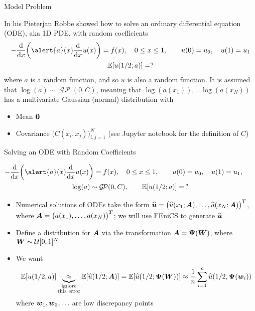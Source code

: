 \documentclass[11pt,compress,xcolor={usenames,dvipsnames},aspectratio=169]{beamer}
\DeclareMathOperator{\GP}{\mathcal{G} \! \mathcal{P}}
\newcommand{\hvu}{\widehat{\vu}}
\newcommand{\hu}{\widehat{u}}
\begin{document}
\begin{frame}{Model Problem}

\vspace{-4ex}

In his \href{https://qmcpy.org/2021/06/04/elliptic-pde-demo/}{} Pieterjan Robbe showed how to solve an ordinary differential equation (ODE), aka 1D PDE, with random coefficients
\begin{gather*}
-\frac{\dif }{\dif x}\biggl(\alert{a}(x) \frac{\dif}{\dif x} u(x) \biggr) = f(x), \quad 0 \leq x \leq 1, \qquad
u(0) = u_0, \quad
u(1) = u_1 \\
\Ex[u(1/2;a)] = ?
\end{gather*}
where \alert{$a$} is a \alert{random} function, and so $u$ is also a \alert{random} function.  It is assumed that $\log(a) \sim \GP(0,C)$, meaning that $\log(a(x_1)), \ldots \log(a(x_N))$ has a \alert{multivariate Gaussian (normal)} distribution with
\begin{itemize}
    \item Mean $\boldsymbol{0}$
    \item Covariance $\bigl( C(x_i,x_j) \bigr)_{i,j=1}^N$ (see Jupyter notebook for the definition of $C$)
\end{itemize}

\end{frame}


\begin{frame}{Solving an ODE with Random Coefficients}

\vspace{-8ex}
\begin{gather*}
-\frac{\dif }{\dif x}\biggl(\alert{a}(x) \frac{\dif}{\dif x} u(x) \biggr) = f(x), \quad 0 \leq x \leq 1, \qquad
u(0) = u_0, \quad
u(1) = u_1, \qquad \\
\log(a) \sim \GP(0,C), \qquad \Ex[u(1/2;a)] = \, ?
\end{gather*}

\vspace{-3ex}
\begin{itemize}
    \item Numerical solutions of ODEs take the form $\hvu = \bigl(\hu(x_1;\vA), \ldots, \hu(x_N;\vA)\bigr)^T$, where $\boldsymbol{A} = \bigl( a(x_1), \dots, a(x_N) \bigr)^T$; we will use FEniCS to generate $\hvu$
    \item  Define a distribution for $\boldsymbol{A}$ via the transformation $\boldsymbol{A} = \boldsymbol{\Psi}(\boldsymbol{W})$, where $\boldsymbol{W} \sim \mathcal{U}[0,1]^N$
    \item We want 
    \[
    \Ex[u(1/2,a)] \underbrace{\approx}_{\substack{\text{ignore} \\ \text{this error}}} \Ex[\hu(1/2;\vA)] = \Ex[\hu(1/2;\vPsi(\vW))] \approx \frac 1n \sum_{i=1}^n \hu(1/2,\vPsi(\vw_i))
    \]
    where $\boldsymbol{w}_1, \boldsymbol{w}_2, \ldots$ are low discrepancy points
    
\end{itemize}

    
\end{frame}
\end{document}
